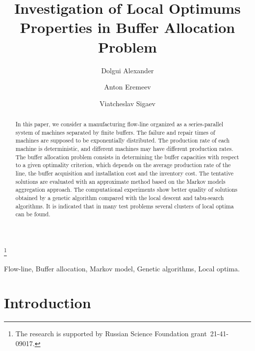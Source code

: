 \documentclass{ifacconf}
\begin{document}
\begin{frontmatter}

\title{Investigation of Local Optimums Properties in Buffer Allocation Problem} 

\thanks[footnoteinfo]{The research is supported by Russian Science Foundation  grant~21-41-09017.}

\author[First]{Dolgui Alexander} 
\author[Second]{Anton Eremeev} 
\author[Third]{Viatcheslav Sigaev}

\address[First]{IMT Atlantique, Nantes, France}
\address[Second]{Sobolev Institute of Mathematics SB RAS, Novosibirsk, Russia (e-mail: eremeev@ofim.oscsbras.ru).}
\address[Third]{Avtomatika-Servis LLC, Omsk, Russia (e-mail: sigvs@yandex.ru).}


\begin{abstract}                %
In this paper, we consider a manufacturing flow-line
organized as a series-parallel system of machines separated by
finite buffers. The failure and repair times of machines are
supposed to be exponentially distributed. The production rate of
each machine is deterministic, and different machines may have
different production rates. The buffer allocation problem consists
in determining the buffer capacities with respect to a given
optimality criterion, which depends on the average production rate
of the line, the buffer acquisition and installation cost and the
inventory cost. The tentative solutions are evaluated with an
approximate method based on the Markov models aggregation
approach. The computational experiments show better quality of
solutions obtained by a genetic algorithm compared with the local
descent and tabu-search algorithms. It is indicated that in many
test problems several clusters of local optima can be found.
\end{abstract}

\begin{keyword}
Flow-line, Buffer allocation, Markov model, Genetic algorithms, Local optima.
\end{keyword}

\end{frontmatter}

\section{Introduction}
\end{document}

